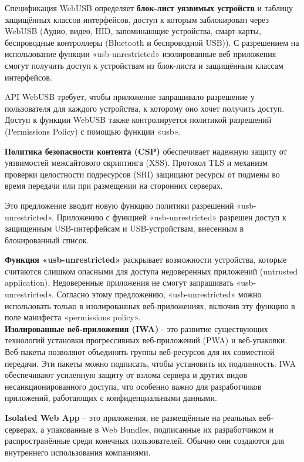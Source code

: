 \documentclass[12pt]{article}
\begin{document}
Спецификация WebUSB определяет \textbf{блок-лист уязвимых устройств} и таблицу защищённых классов интерфейсов, доступ к которым заблокирован через WebUSB (Аудио, видео, HID, запоминающие устройства, смарт-карты, беспроводные контроллеры (Bluetooth и беспроводной USB)). С разрешением на использование функции «usb-unrestricted» изолированные веб приложения смогут получить доступ к устройствам из блок-листа и защищённым классам интерфейсов.

API WebUSB требует, чтобы приложение запрашивало разрешение у пользователя для каждого устройства, к которому оно хочет получить доступ. Доступ к функции WebUSB также контролируется политикой разрешений (Permissions Policy) с помощью функции «usb». 

\textbf{Политика безопасности контента (CSP)} обеспечивает надежную защиту от уязвимостей межсайтового скриптинга (XSS). Протокол TLS и механизм проверки целостности подресурсов (SRI) защищают ресурсы от подмены во время передачи или при размещении на сторонних серверах. 

Это предложение вводит новую функцию политики разрешений «usb-unrestricted». Приложению с функцией «usb-unrestricted» разрешен доступ к защищенным USB-интерфейсам и USB-устройствам, внесенным в блокированный список.

\textbf{Функция «usb-unrestricted»} раскрывает возможности устройства, которые считаются слишком опасными для доступа недоверенных приложений (untrusted application). Недоверенные приложения не смогут запрашивать «usb-unrestricted». Согласно этому предложению, «usb-unrestricted» можно использовать только в изолированных веб-приложениях, включив эту функцию в поле манифеста «permissions policy». \\

\textbf{Изолированные веб-приложения (IWA)} - это развитие существующих технологий установки прогрессивных веб-приложений (PWA) и веб-упаковки.
Веб-пакеты позволяют объединять группы веб-ресурсов для их совместной передачи. Эти пакеты можно подписать, чтобы установить их подлинность. IWA обеспечивают усиленную защиту от взлома сервера и других видов несанкционированного доступа, что особенно важно для разработчиков приложений, работающих с конфиденциальными данными. 

\textbf{Isolated Web App} -- это приложения, не размещённые на реальных веб-серверах, а упакованные в Web Bundles, подписанные их разработчиком и распространённые среди конечных пользователей. Обычно они создаются для внутреннего использования компаниями. 
\end{document}
